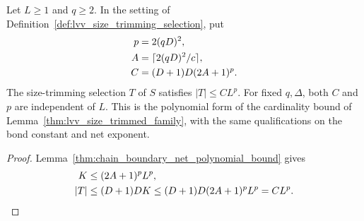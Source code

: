 \begin{lemma}
    \label{thm:lvv_size_trimmed_family_polynomial}
    \leanok
    Let $L\ge1$ and $q\ge2$. In the setting of
    Definition~\ref{def:lvv_size_trimming_selection}, put
    \begin{align}
        p & =2(qD)^2,\notag               \\
        A & =\lceil2(qD)^2/c\rceil,\notag \\
        C & =(D+1)D(2A+1)^p.\notag
    \end{align}
    The size-trimming selection $T$ of $S$ satisfies $|T|\le CL^p$.
    For fixed $q,\Delta$, both $C$ and $p$ are independent of $L$.
    This is the polynomial form of the cardinality bound of
    Lemma~\ref{thm:lvv_size_trimmed_family}, with the same qualifications on
    the bond constant and net exponent.
\end{lemma}
\begin{proof}\leanok
    Lemma~\ref{thm:chain_boundary_net_polynomial_bound} gives
    \begin{align}
        K   & \le(2A+1)^pL^p,\notag                      \\
        |T| & \le(D+1)DK\le(D+1)D(2A+1)^pL^p=CL^p.\notag
    \end{align}
\end{proof}

